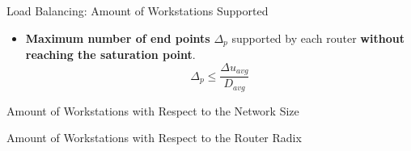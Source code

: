 %
\begin{frame}[t]{Load Balancing: Amount of Workstations Supported}
\begin{itemize}
\item \textbf{Maximum number of end points} $\Delta_p$ supported by each router \textbf{without reaching the saturation point}.
$$\displaystyle\Delta_p\leq \frac{\Delta u_{avg}}{D_{avg}}$$
\end{itemize}
\end{frame}
\begin{frame}[t]{Amount of Workstations with Respect to the Network Size}
\end{frame}
\begin{frame}[t]{Amount of Workstations with Respect to the Router Radix}
\end{frame}
